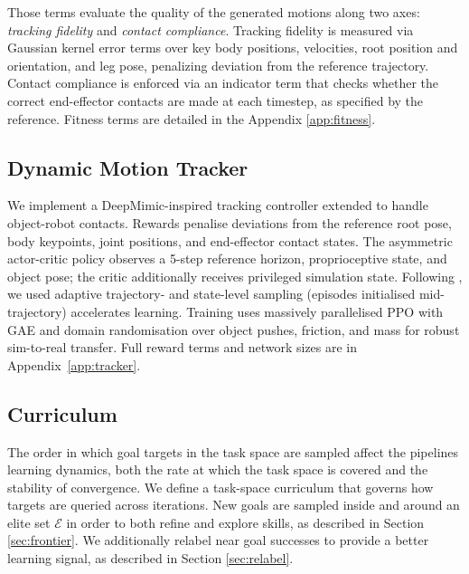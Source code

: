 \documentclass{article}
\begin{document}
Those terms evaluate the quality of the generated motions along two axes: \textit{tracking fidelity} and 
\textit{contact compliance}. Tracking fidelity is measured via 
Gaussian kernel error terms over key body positions, velocities, 
root position and orientation, and leg pose, penalizing deviation 
from the reference trajectory. Contact compliance is enforced via 
an indicator term that checks whether the correct end-effector 
contacts are made at each timestep, as specified by the reference. Fitness terms are detailed in the Appendix \ref{app:fitness}.


\subsection{Dynamic Motion Tracker}\label{sec:dynamic_motion_tracker}
We implement a DeepMimic-inspired \cite{peng2018deepmimic} tracking controller extended to handle object-robot contacts. Rewards penalise deviations from the reference root pose, body keypoints, joint positions, and end-effector contact states. The asymmetric actor-critic policy observes a 5-step reference horizon, proprioceptive state, and object pose; the critic additionally receives privileged simulation state. Following \cite{liao2025beyondmimicmotiontrackingversatile}, we used adaptive trajectory- and state-level sampling (episodes initialised mid-trajectory) accelerates learning. Training uses massively parallelised PPO with GAE and domain randomisation over object pushes, friction, and mass for robust sim-to-real transfer. Full reward terms and network sizes are in Appendix~\ref{app:tracker}.



\subsection{Curriculum}\label{sec:curriculum}
The order in which goal targets in the task space are sampled affect the pipelines learning dynamics, both the rate at which the task space is covered and the stability of convergence. We define a task-space curriculum that governs how targets are queried across iterations. New goals are sampled inside and around an elite set $\mathcal{E}$ in order to both refine and explore skills, as described in Section \ref{sec:frontier}. We additionally relabel near goal successes to provide a better learning signal, as described in Section \ref{sec:relabel}.
\end{document}
